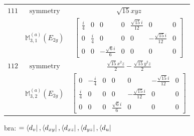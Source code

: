 \documentclass[fleqn,8pt,landscape]{jsarticle}
\begin{document}
\begin{longtable}{ccc}
$ 111 $ & $ \text{symmetry} $ & $ \sqrt{15} x y z $ \\
$  $ & $ \mathbb{M}_{3,1}^{(a)}(E_{2g}) $ & $ \begin{bmatrix} \frac{i}{4} & 0 & 0 & 0 & \frac{\sqrt{15} i}{12} & 0 & 0 \\ 0 & \frac{i}{4} & 0 & 0 & 0 & - \frac{\sqrt{15} i}{12} & 0 \\ 0 & 0 & - \frac{\sqrt{6} i}{6} & 0 & 0 & 0 & 0 \end{bmatrix} $ \\ \hline
$ 112 $ & $ \text{symmetry} $ & $ \frac{\sqrt{15} x^{2} z}{2} - \frac{\sqrt{15} y^{2} z}{2} $ \\
$  $ & $ \mathbb{M}_{3,2}^{(a)}(E_{2g}) $ & $ \begin{bmatrix} 0 & - \frac{i}{4} & 0 & 0 & 0 & - \frac{\sqrt{15} i}{12} & 0 \\ \frac{i}{4} & 0 & 0 & 0 & - \frac{\sqrt{15} i}{12} & 0 & 0 \\ 0 & 0 & 0 & \frac{\sqrt{6} i}{6} & 0 & 0 & 0 \end{bmatrix} $ \\ \hline
\end{longtable}
bra: $=\bra{d_{v}}, \bra{d_{xy}}, \bra{d_{xz}}, \bra{d_{yz}}, \bra{d_{u}}$
\end{document}
